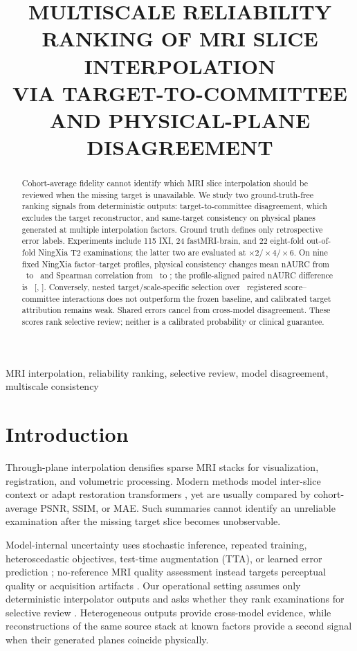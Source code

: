 \documentclass{article}
\title{MULTISCALE RELIABILITY RANKING OF MRI SLICE INTERPOLATION\\
VIA TARGET-TO-COMMITTEE AND PHYSICAL-PLANE DISAGREEMENT}
\begin{document}
\ninept
\maketitle

\begin{abstract}
Cohort-average fidelity cannot identify which MRI slice interpolation should be reviewed when the missing target is unavailable. We study two ground-truth-free ranking signals from deterministic outputs: target-to-committee disagreement, which excludes the target reconstructor, and same-target consistency on physical planes generated at multiple interpolation factors. Ground truth defines only retrospective error labels. Experiments include 115 IXI, 24 fastMRI-brain, and 22 eight-fold out-of-fold NingXia T2 examinations; the latter two are evaluated at $\times2/\times4/\times6$. On nine fixed NingXia factor--target profiles, physical consistency changes mean nAURC from \NestedBaselineNAURC\ to \NestedTriageNAURC\ and Spearman correlation from \NestedBaselineRho\ to \NestedTriageRho; the profile-aligned paired nAURC difference is \NestedDeltaNAURC\ [\NestedDeltaNAURCLo, \NestedDeltaNAURCHi]. Conversely, nested target/scale-specific selection over \NestedInteractionCount\ registered score--committee interactions does not outperform the frozen baseline, and calibrated target attribution remains weak. Shared errors cancel from cross-model disagreement. These scores rank selective review; neither is a calibrated probability or clinical guarantee.
\end{abstract}

\begin{keywords}
MRI interpolation, reliability ranking, selective review, model disagreement, multiscale consistency
\end{keywords}

\section{Introduction}
Through-plane interpolation densifies sparse MRI stacks for visualization, registration, and volumetric processing. Modern methods model inter-slice context or adapt restoration transformers \cite{song2024i3net,liang2021swinir,chen2022hat}, yet are usually compared by cohort-average PSNR, SSIM, or MAE. Such summaries cannot identify an unreliable examination after the missing target slice becomes unobservable.

Model-internal uncertainty uses stochastic inference, repeated training, heteroscedastic objectives, test-time augmentation (TTA), or learned error prediction \cite{gal2016dropout,lakshminarayanan2017deepensembles,kendall2017uncertainties,wang2018tta,edupuganti2021uqmri,hu2021predict,zhang2024trainingfree}; no-reference MRI quality assessment instead targets perceptual quality or acquisition artifacts \cite{stepien2022nriqa}. Our operational setting assumes only deterministic interpolator outputs and asks whether they rank examinations for selective review \cite{elyaniv2010selective,geifman2019selectivenet,ding2020aurc}. Heterogeneous outputs provide cross-model evidence, while reconstructions of the same source stack at known factors provide a second signal when their generated planes coincide physically.
\end{document}

